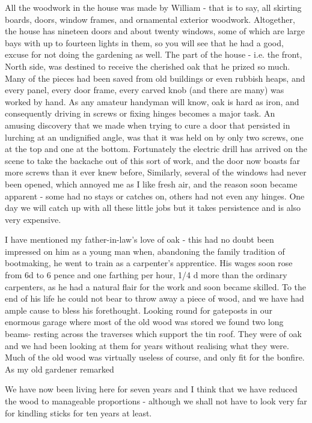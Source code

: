 All the woodwork in the house was made by William - that is to say, all skirting boards, doors, window frames, and ornamental exterior woodwork. Altogether, the house has nineteen doors and about twenty windows, some of which are large bays with up to fourteen lights in them, so you will see that he had a good, excuse for not doing the gardening as well. The  part of the house - i.e. the front, North side, was destined to receive the cherished oak that he prized so much. Many of the pieces had been saved from old buildings or even rubbish heaps, and every panel, every door frame, every carved knob (and there are many) was worked by hand. As any amateur handyman will know, oak is hard as iron, and consequently driving in screws or fixing hinges becomes a major task. An amusing discovery that we made when trying to cure a door that persisted in lurching at an undignified angle, was that it was held on by only two screws, one at the top and one at the bottom. Fortunately the electric drill has arrived on the scene to take the backache out of this sort of work, and the door now boasts far more screws than it ever knew before, Similarly, several of the windows had never been opened, which annoyed me as I like fresh air, and the reason soon became apparent - some had no stays or catches on, others had not even any hinges. One day we will catch up with all these little jobs but it takes persistence and is also very expensive.

I have mentioned my father-in-law's love of oak - this had no doubt been impressed on him as a young man when, abandoning the family tradition of bootmaking, he went to train as a carpenter's apprentice. His wages soon rose from 6d to 6 pence and one farthing per hour, 1/4 d more than the ordinary carpenters, as he had a natural flair for the work and soon became skilled. To the end of his life he could not bear to throw away a piece of wood, and we have had ample cause to bless his forethought. Looking round for gateposts in our enormous garage where most of the old wood was stored we found two long beams- resting across the traverses which support the tin roof. They were of oak and we had been looking at them for years without realising what they were. Much of the old wood was virtually useless of course, and only fit for the bonfire. As my old gardener remarked 

We have now been living here for seven years and I think that we have reduced the wood to manageable proportions - although we shall not have to look very far for kindling sticks for ten years at least. 

